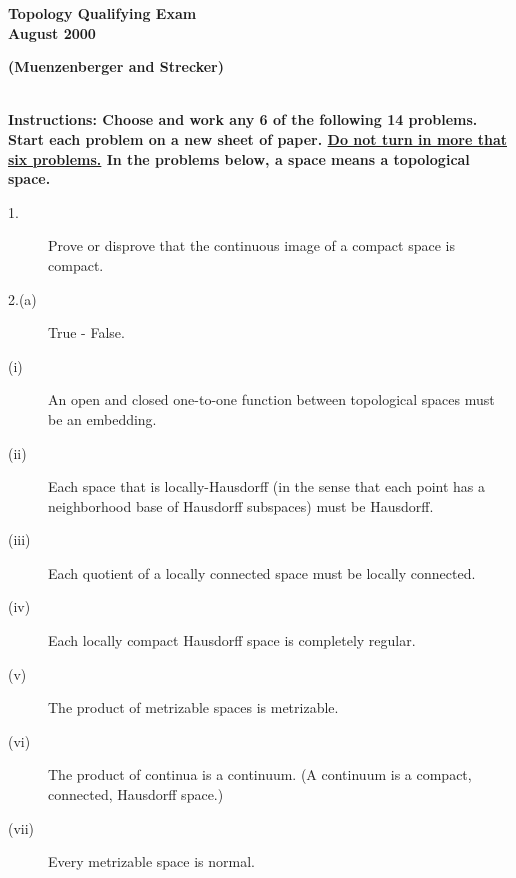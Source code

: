 \documentclass{article}
\begin{document}
\begin{large}


\begin{center}\begin{LARGE}
  {\bf  Topology Qualifying Exam}\\ 
  {\bf August 2000}\\ \end{LARGE}
  {\bf (Muenzenberger and Strecker)}
\end{center}

\vspace{0.1in}
\noindent\hrulefill\\
{\bf Instructions:
Choose and work any 6 of the following 14 problems. Start each problem on
a new sheet of paper. \underline {Do not turn in more
that six problems.}
In the problems below, a space means a topological space.
}

\vspace{0.2in}



\begin{description}

\item[1.]
Prove or disprove that  the continuous image of a compact space is compact.

\item[2.(a)]
True - False.

\item[\quad \quad (i)]
An open and closed one-to-one function between topological spaces must be
an embedding.

\item[\quad \quad (ii)]
Each space that is locally-Hausdorff (in the sense that each point has
a neighborhood base of Hausdorff subspaces) must be Hausdorff.

\item[\quad \quad (iii)]
Each quotient of a locally connected space must be locally connected.

\item[\quad \quad (iv)]
Each locally compact Hausdorff space is completely regular.

\item[\quad \quad (v)]
The product of metrizable spaces is metrizable.

\item[\quad \quad (vi)]
The product of continua is a continuum. (A continuum is a compact, connected,
Hausdorff space.)

\item[\quad \quad (vii)]
Every metrizable space is normal.


\end{description}
\end{large}
\end{document}
